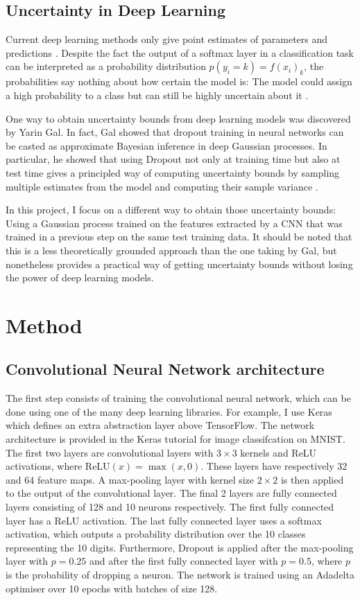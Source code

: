 \documentclass{article}
\begin{document}
\subsection{Uncertainty in Deep Learning}
Current deep learning methods only give point estimates of parameters and predictions \cite{Goodfellow-et-al-2016}. Despite the fact the output of a softmax layer in a classification task can be interpreted as a probability distribution $p(y_i = k) = f(x_i)_k$, the probabilities say nothing about how certain the model is: The model could assign a high probability to a class but can still be highly uncertain about it \cite{gal2016dropout}. 

One way to obtain uncertainty bounds from deep learning models was discovered by Yarin Gal. In fact, Gal \cite{Gal2016Uncertainty} showed that dropout training in neural networks can be casted as approximate Bayesian inference in deep Gaussian processes. In particular, he showed that using Dropout not only at training time but also at test time gives a principled way of computing uncertainty bounds by sampling multiple estimates from the model and computing their sample variance \cite{Gal2016Uncertainty}.

In this project, I focus on a different way to obtain those uncertainty bounds: Using a Gaussian process trained on the features extracted by a CNN that was trained in a previous step on the same test training data. It should be noted that this is a less theoretically grounded approach than the one taking by Gal, but nonetheless provides a practical way of getting uncertainty bounds without losing the power of deep learning models. 

\section{Method}
\subsection{Convolutional Neural Network architecture}
The first step consists of training the convolutional neural network, which can be done using one of the many deep learning libraries. For example, I use Keras \cite{chollet2015keras} which defines an extra abstraction layer above TensorFlow. The network architecture is provided in the Keras tutorial for image classifcation on MNIST. The first two layers are convolutional layers with $3 \times 3$ kernels and ReLU activations, where $\textrm{ReLU}(x) = \max(x, 0)$. These layers have respectively 32 and 64 feature maps. A max-pooling layer with kernel size $2 \times 2$ is then applied to the output of the convolutional layer. The final 2 layers are fully connected layers consisting of 128 and 10 neurons respectively. The first fully connected layer has a ReLU activation. The last fully connected layer uses a softmax activation, which outputs a probability distribution over the 10 classes representing the 10 digits. Furthermore, Dropout \cite{srivastava2014dropout} is applied after the max-pooling layer with $p=0.25$ and after the first fully connected layer with $p=0.5$, where $p$ is the probability of dropping a neuron. The network is trained using an Adadelta optimiser over 10 epochs with batches of size 128.
\end{document}
